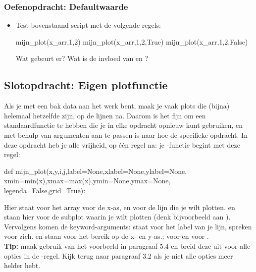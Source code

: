 \documentclass[a4paper,11pt, fleqn]{article}
\begin{document}

\subsubsection*{Oefenopdracht: Defaultwaarde}
\begin{itemize}
	\item Test bovenstaand script met de volgende regels:
	\begin{python}
mijn_plot(x_arr,1,2)
mijn_plot(x_arr,1,2,True)
mijn_plot(x_arr,1,2,False)
	\end{python}
	Wat gebeurt er? Wat is de invloed van  en ?
\end{itemize}

\subsection{Slotopdracht: Eigen plotfunctie}
Als je met een bak data aan het werk bent, maak je vaak plots die (bijna) helemaal hetzelfde zijn, op de lijnen na. Daarom is het fijn om een standaardfunctie te hebben die je in elke opdracht opnieuw kunt gebruiken, en met behulp van argumenten aan te passen is naar hoe de specifieke opdracht. In deze opdracht heb je alle vrijheid, op \'e\'en regel na: je -functie begint met deze regel:

\begin{python}
def mijn_plot(x,y,i,j,label=None,xlabel=None,ylabel=None,
	      xmin=min(x),xmax=max(x),ymin=None,ymax=None,
	      legenda=False,grid=True):
\end{python}
Hier staat  voor het array voor de x-as, en  voor de lijn die je wilt plotten.  en  staan hier voor de subplot waarin je wilt plotten (denk bijvoorbeeld aan ). Vervolgens komen de keyword-arguments:  staat voor het label van je lijn,  spreken voor zich.  en  staan voor het bereik op de x- en y-as.;  voor  en  voor .\\
{\bf Tip:} maak gebruik van het voorbeeld in paragraaf 5.4 en breid deze uit voor alle opties in de -regel. Kijk terug naar paragraaf 3.2 als je niet alle opties meer helder hebt.
\end{document}
